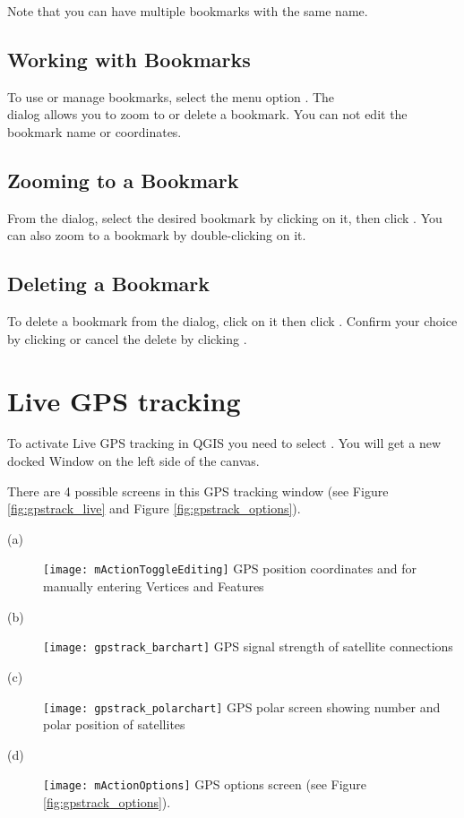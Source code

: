 Note that you can have multiple bookmarks with the same name.

\subsection{Working with Bookmarks}
To use or manage bookmarks, select the menu
option  \arrow {}. The \\
 dialog allows you to zoom to or delete a bookmark.
You can not edit the bookmark name or coordinates.

\subsection{Zooming to a Bookmark}
From the  dialog, select the desired bookmark by clicking on it,
then click .
You can also zoom to a bookmark by double-clicking on it.

\subsection{Deleting a Bookmark}
To delete a bookmark from the 
dialog, click on it then click .
Confirm your choice by clicking  or cancel the
delete by clicking .

\section{Live GPS tracking}\label{sec:gpstracking}

To activate Live GPS tracking in QGIS you need to select
 \arrow {}. You will get a new
docked Window on the left side of the canvas.

There are 4 possible screens in this GPS tracking window
(see Figure \ref{fig:gpstrack_live} and Figure \ref{fig:gpstrack_options}).

\begin{description}
 \item[(a)] \texttt{[image: mActionToggleEditing]}
GPS position coordinates and for manually entering Vertices and Features
 \item[(b)] \texttt{[image: gpstrack\_barchart]}
GPS signal strength of satellite connections
 \item[(c)] \texttt{[image: gpstrack\_polarchart]}
GPS polar screen showing number and polar position of satellites
 \item[(d)] \texttt{[image: mActionOptions]}
GPS options screen (see Figure \ref{fig:gpstrack_options}).
\end{description}

